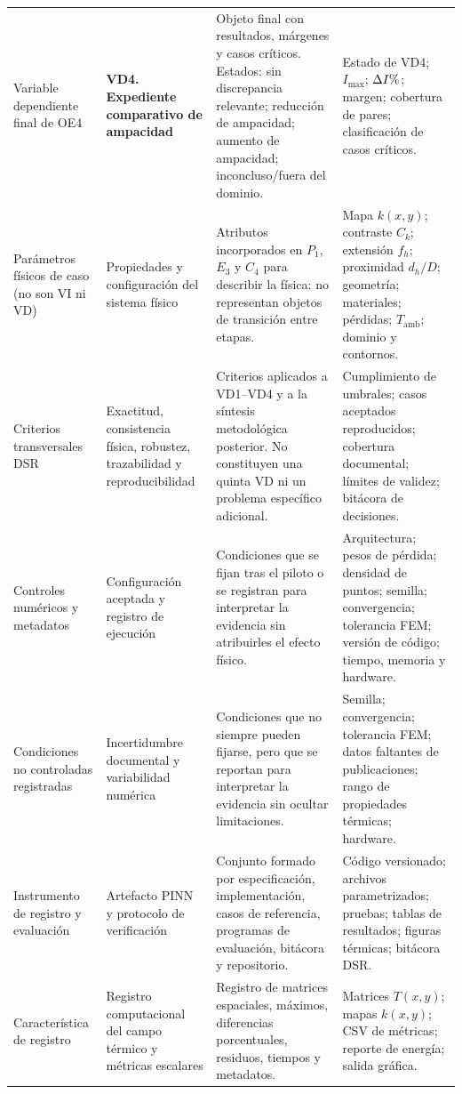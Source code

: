 \documentclass[11pt,a4paper,oneside]{report}
\newcommand{\Imax}{I_{\max}}
\newcommand{\kx}{k(x,y)}
\newcommand{\pct}{\mbox{\char37}}
\begin{document}
\begin{singlespace}
\begin{landscape}
\begin{longtable}{L{4.00cm}L{4.20cm}L{8.20cm}L{6.30cm}}
Variable dependiente final de OE4 & \textbf{VD4. Expediente comparativo de ampacidad} & Objeto final con resultados, márgenes y casos críticos. Estados: sin discrepancia relevante; reducción de ampacidad; aumento de ampacidad; inconcluso/fuera del dominio. & Estado de VD4; $\Imax$; $\Delta I\pct$; margen; cobertura de pares; clasificación de casos críticos. \\

Parámetros físicos de caso (no son VI ni VD) & Propiedades y configuración del sistema físico & Atributos incorporados en $P_1$, $E_3$ y $C_4$ para describir la física: no representan objetos de transición entre etapas. & Mapa $\kx$; contraste $C_k$; extensión $f_h$; proximidad $d_h/D$; geometría; materiales; pérdidas; $T_{\mathrm{amb}}$; dominio y contornos. \\

Criterios transversales DSR & Exactitud, consistencia física, robustez, trazabilidad y reproducibilidad & Criterios aplicados a VD1--VD4 y a la síntesis metodológica posterior. No constituyen una quinta VD ni un problema específico adicional. & Cumplimiento de umbrales; casos aceptados reproducidos; cobertura documental; límites de validez; bitácora de decisiones. \\

Controles numéricos y metadatos & Configuración aceptada y registro de ejecución & Condiciones que se fijan tras el piloto o se registran para interpretar la evidencia sin atribuirles el efecto físico. & Arquitectura; pesos de pérdida; densidad de puntos; semilla; convergencia; tolerancia FEM; versión de código; tiempo, memoria y hardware. \\

Condiciones no controladas registradas & Incertidumbre documental y variabilidad numérica & Condiciones que no siempre pueden fijarse, pero que se reportan para interpretar la evidencia sin ocultar limitaciones. & Semilla; convergencia; tolerancia FEM; datos faltantes de publicaciones; rango de propiedades térmicas; hardware. \\

Instrumento de registro y evaluación & Artefacto PINN y protocolo de verificación & Conjunto formado por especificación, implementación, casos de referencia, programas de evaluación, bitácora y repositorio. & Código versionado; archivos parametrizados; pruebas; tablas de resultados; figuras térmicas; bitácora DSR. \\

Característica de registro & Registro computacional del campo térmico y métricas escalares & Registro de matrices espaciales, máximos, diferencias porcentuales, residuos, tiempos y metadatos. & Matrices $T(x,y)$; mapas $\kx$; CSV de métricas; reporte de energía; salida gráfica. \\


\end{longtable}
\end{landscape}
\end{singlespace}
\end{document}
